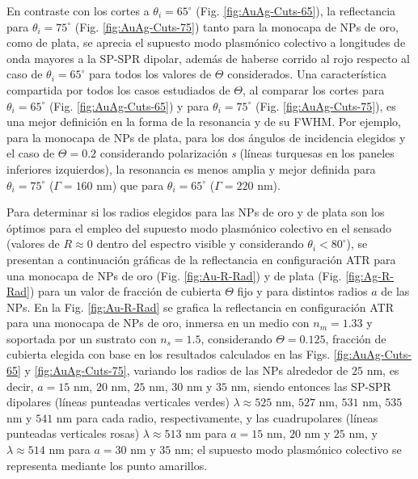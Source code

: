 En contraste con los cortes a $\theta_i=65^\circ$ (Fig. \ref{fig:AuAg-Cuts-65}), la reflectancia para $\theta_i=75^\circ$ (Fig. \ref{fig:AuAg-Cuts-75}) tanto para la monocapa de NPs de oro, como de plata, se aprecia el supuesto modo plasmónico colectivo a longitudes de onda mayores a la SP-SPR dipolar, además de haberse corrido al rojo respecto al caso de $\theta_i=65^\circ$ para todos los valores de $\Theta$ considerados. Una característica compartida por todos los casos estudiados de $\Theta$, al comparar los cortes para $\theta_i=65^\circ$ (Fig. \ref{fig:AuAg-Cuts-65}) y para $\theta_i=75^\circ$ (Fig. \ref{fig:AuAg-Cuts-75}), es una mejor definición en la forma de la resonancia y de su FWHM. Por ejemplo, para la monocapa de NPs de plata, para los dos ángulos de incidencia elegidos y el caso de $\Theta=0.2$ considerando polarización \emph{s} (líneas turquesas en los paneles inferiores izquierdos), la resonancia es menos amplia y mejor definida para $\theta_i=75^\circ$ ($\Gamma=160$ nm) que para $\theta_i=65^\circ$ ($\Gamma=220$ nm).%

Para determinar si los radios elegidos para las NPs de oro y de plata son los óptimos para el empleo del supuesto modo plasmónico colectivo en el sensado (valores de $R\approx 0$ dentro del espectro visible y considerando $\theta_i<80^\circ$), se presentan a continuación gráficas de la reflectancia en configuración ATR para una monocapa de NPs de oro (Fig. \ref{fig:Au-R-Rad}) y de plata (Fig. \ref{fig:Ag-R-Rad}) para un valor de fracción de cubierta $\Theta$ fijo y para distintos radios $a$ de las NPs. En la Fig. \ref{fig:Au-R-Rad} se grafica la reflectancia en configuración ATR para una monocapa de NPs de oro, inmersa en un medio con $n_m=1.33$ y soportada por un sustrato con $n_s=1.5$, considerando  $\Theta=0.125$, fracción de cubierta elegida con base en los resultados calculados en las Figs. \ref{fig:AuAg-Cuts-65} y \ref{fig:AuAg-Cuts-75}, variando los radios de las NPs alrededor de $25$ nm, es decir, $a=15$ nm, $20$ nm, $25$ nm, $30$ nm y $35$ nm, siendo entonces las SP-SPR dipolares (líneas punteadas verticales verdes) $\lambda\approx 525$ nm, $527$ nm, $531$ nm, $535$ nm y $541$ nm para cada radio, respectivamente, y las cuadrupolares (líneas punteadas verticales rosas) $\lambda\approx 513$ nm para $a=15$ nm, $20$ nm y $25$ nm, y $\lambda\approx 514$ nm para $a=30$ nm y $35$ nm; el supuesto modo plasmónico colectivo se representa mediante los punto amarillos.

